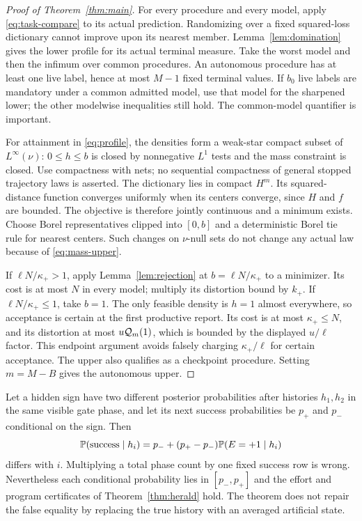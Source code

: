 \begin{proof}[Proof of Theorem~\ref{thm:main}]
For every procedure and every model, apply \eqref{eq:task-compare} to its actual prediction. Randomizing over a fixed squared-loss dictionary cannot improve upon its nearest member. Lemma~\ref{lem:domination} gives the lower profile for its actual terminal measure. Take the worst model and then the infimum over common procedures. An autonomous procedure has at least one live label, hence at most $M-1$ fixed terminal values. If $b_0$ live labels are mandatory under a common admitted model, use that model for the sharpened lower; the other modelwise inequalities still hold. The common-model quantifier is important.

For attainment in \eqref{eq:profile}, the densities form a weak-star compact subset of $L^\infty(\nu)$: $0\le h\le b$ is closed by nonnegative $L^1$ tests and the mass constraint is closed. Use compactness with nets; no sequential compactness of general stopped trajectory laws is asserted. The dictionary lies in compact $H^m$. Its squared-distance function converges uniformly when its centers converge, since $H$ and $f$ are bounded. The objective is therefore jointly continuous and a minimum exists. Choose Borel representatives clipped into $[0,b]$ and a deterministic Borel tie rule for nearest centers. Such changes on $\nu$-null sets do not change any actual law because of \eqref{eq:mass-upper}.

If $\ell N/\kappa_+>1$, apply Lemma~\ref{lem:rejection} at $b=\ell N/\kappa_+$ to a minimizer. Its cost is at most $N$ in every model; multiply its distortion bound by $k_+$. If $\ell N/\kappa_+\le1$, take $b=1$. The only feasible density is $h=1$ almost everywhere, so acceptance is certain at the first productive report. Its cost is at most $\kappa_+\le N$, and its distortion at most $u\mathcal Q_m(1)$, which is bounded by the displayed $u/\ell$ factor. This endpoint argument avoids falsely charging $\kappa_+/\ell$ for certain acceptance. The upper also qualifies as a checkpoint procedure. Setting $m=M-B$ gives the autonomous upper.
\end{proof}

\begin{example}\label{ex:closure}
Let a hidden sign have two different posterior probabilities after histories $h_1,h_2$ in the same visible gate phase, and let its next success probabilities be $p_+$ and $p_-$ conditional on the sign. Then
\[
 \mathbb P(\mathrm{success}\mid h_i)
   =p_-+(p_+-p_-)\mathbb P(E=+1\mid h_i)
\]
differs with $i$. Multiplying a total phase count by one fixed success row is wrong. Nevertheless each conditional probability lies in $[p_-,p_+]$ and the effort and program certificates of Theorem~\ref{thm:herald} hold. The theorem does not repair the false equality by replacing the true history with an averaged artificial state.
\end{example}
